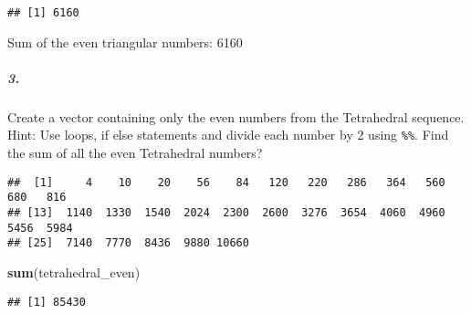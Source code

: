 \documentclass[
]{article}
\newenvironment{Shaded}{\begin{snugshade}}{\end{snugshade}}
\newcommand{\CommentTok}[1]{\textcolor[rgb]{0.56,0.35,0.01}{\textit{#1}}}
\newcommand{\ControlFlowTok}[1]{\textcolor[rgb]{0.13,0.29,0.53}{\textbf{#1}}}
\newcommand{\DecValTok}[1]{\textcolor[rgb]{0.00,0.00,0.81}{#1}}
\newcommand{\KeywordTok}[1]{\textcolor[rgb]{0.13,0.29,0.53}{\textbf{#1}}}
\newcommand{\NormalTok}[1]{#1}
\newcommand{\OperatorTok}[1]{\textcolor[rgb]{0.81,0.36,0.00}{\textbf{#1}}}
\newcommand{\StringTok}[1]{\textcolor[rgb]{0.31,0.60,0.02}{#1}}
\begin{document}
\begin{verbatim}
## [1] 6160
\end{verbatim}

Sum of the even triangular numbers: 6160

\hypertarget{section-2}{%
\subparagraph{3.}\label{section-2}}

Create a vector containing only the even numbers from the Tetrahedral
sequence. Hint: Use loops, if else statements and divide each number by
2 using \texttt{\%\%}. Find the sum of all the even Tetrahedral numbers?

\begin{Shaded}
\end{Shaded}

\begin{verbatim}
##  [1]     4    10    20    56    84   120   220   286   364   560   680   816
## [13]  1140  1330  1540  2024  2300  2600  3276  3654  4060  4960  5456  5984
## [25]  7140  7770  8436  9880 10660
\end{verbatim}

\begin{Shaded}
\begin{Highlighting}[]
\KeywordTok{sum}\NormalTok{(tetrahedral_even)}
\end{Highlighting}
\end{Shaded}

\begin{verbatim}
## [1] 85430
\end{verbatim}
\end{document}

